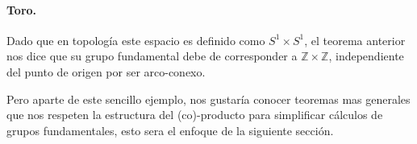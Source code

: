 \paragraph{Toro.} Dado que en topología este espacio es definido como
\(S^1 \times S^1\), el teorema anterior nos dice que su grupo
fundamental debe de corresponder a \(\mathbb Z \times \mathbb Z\),
independiente del punto de origen por ser arco-conexo.

Pero aparte de este sencillo ejemplo, nos gustaría conocer teoremas mas
generales que nos respeten la estructura del (co)-producto para
simplificar cálculos de grupos fundamentales, esto sera el enfoque de la
siguiente sección.